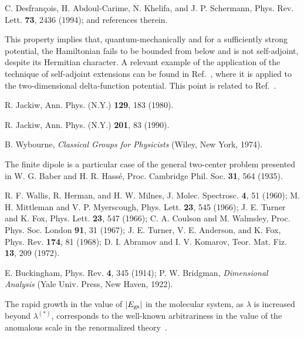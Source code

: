 \documentclass[a4paper,twocolumn,
showpacs,amssymb,aps,prl,superscriptaddress]{revtex4}%
\begin{document}
\begin{thebibliography}{99}
C. Desfran\c{c}ois, H. Abdoul-Carime, N. Khelifa, and J. P. Schermann,
Phys. Rev. Lett. {\bf 73}, 2436 (1994); and references therein.

This property implies that, quantum-mechanically and for a
sufficiently strong potential, the Hamiltonian fails to be bounded
from below and is not self-adjoint, despite its Hermitian
character. A relevant example of the application of the technique
of self-adjoint extensions can be found in Ref.~\cite{jac:91},
where it is applied to the two-dimensional delta-function
potential. This point is related to Ref.~\cite{est:86}.

R. Jackiw, Ann. Phys. (N.Y.) {\bf 129}, 183 (1980).

R. Jackiw, Ann. Phys. (N.Y.) {\bf 201}, 83 (1990).

B. Wybourne, {\em Classical Groups for Physicists\/} (Wiley, New
York, 1974).

The finite dipole is a particular case of the general two-center
problem presented in W. G. Baber and H. R. Hass\'{e}, Proc.
Cambridge Phil. Soc. {\bf 31}, 564 (1935).

R. F. Wallis, R. Herman, and H. W. Milnes, J. Molec. Spectrosc.
{\bf 4}, 51 (1960); M. H. Mittleman and V. P. Myerscough, Phys.
Lett. {\bf 23}, 545 (1966);
 J. E. Turner and K. Fox,  Phys. Lett.  {\bf 23}, 547 (1966);
 C. A. Coulson and M. Walmsley, Proc. Phys. Soc.
London {\bf 91}, 31 (1967); J. E. Turner, V. E. Anderson, and K.
Fox, Phys. Rev. {\bf 174}, 81 (1968); D. I. Abramov and I. V.
Komarov, Teor. Mat. Fiz. {\bf 13}, 209 (1972).

E. Buckingham, Phys. Rev. {\bf 4}, 345 (1914); P. W. Bridgman,
{\em Dimensional Analysis\/} (Yale Univ. Press, New Haven, 1922).

The rapid growth in the value of $|E_{\rm gs}|$
in the molecular system, as $\lambda$ is increased beyond
$\lambda^{(*)}$, 
corresponds to the well-known arbitrariness in the value 
of the anomalous scale in the renormalized theory~\cite{cam:00}.

\end{thebibliography}
\end{document}
